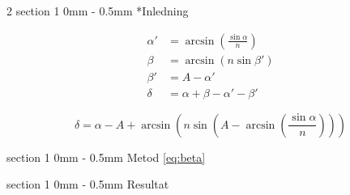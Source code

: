 \documentclass[a4paper]{article}
\makeatletter
\renewcommand{\section}{\@startsection
{section}%
{1}%
{0mm}%
{-\baselineskip}%
{0.5mm}%
{\normalfont\bfseries}} %
\makeatother
\begin{document}
\begin{multicols}{2}
  \section*{Inledning}

%

  \begin{align} 
  \alpha' &= \arcsin\left(\frac{\sin\alpha}{n}\right)\label{eq:alphaPrim}\\
  \beta &= \arcsin\left(n \sin\beta'\right)\label{eq:beta}\\
  \beta' &= A-\alpha'\label{eq:betaPrim}\\
  \delta &= \alpha+\beta-\alpha'-\beta'  \label{eq:delta}
  \end{align}

  \begin{equation} \label{eq:avlänkning}
  \delta = \alpha-A+\arcsin\left(n \sin\left(A-\arcsin\left(\frac{\sin\alpha}{n}\right)\right)\right)
  \end{equation}

  \section{Metod}
  \autoref{eq:beta}

  \section{Resultat}


\end{multicols}
\end{document}
